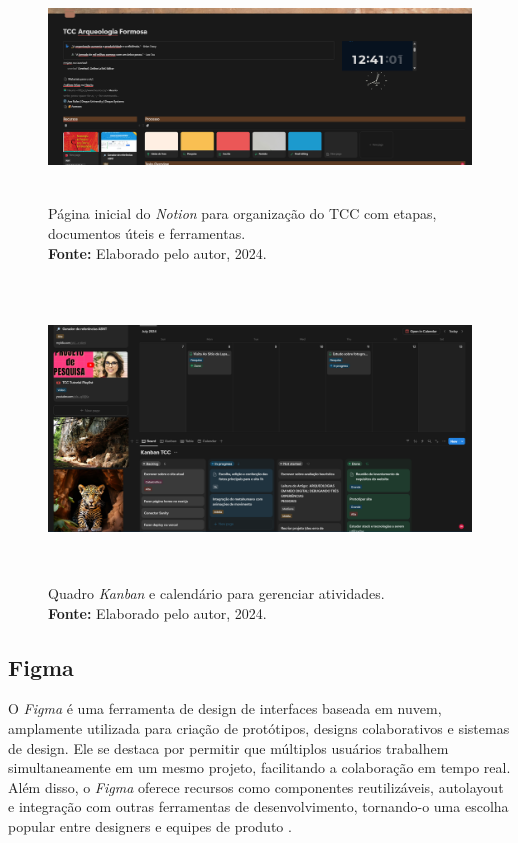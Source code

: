 {\begin{figure}[H]
    \centering
    \includegraphics[height=6cm, keepaspectratio]{img/Notion/pagina inicial.png}
    \caption{ Página inicial do \textit{Notion} para organização do TCC com etapas, \\ documentos úteis e ferramentas. \\
        \textbf{Fonte:} Elaborado pelo autor, 2024.}
    \label{fig:notion inicial}
\end{figure}

\begin{figure}[H]
    \centering
    \includegraphics[height=8cm, keepaspectratio]{img/Notion/kanban.png}
    \caption{ Quadro \textit{Kanban} e calendário para gerenciar atividades. \\
        \textbf{Fonte:} Elaborado pelo autor, 2024.}
    \label{fig:kanban notion}
\end{figure}


\subsection{Figma}
O \textit{Figma} é uma ferramenta de design de interfaces baseada em nuvem, amplamente utilizada para criação de protótipos, designs colaborativos e sistemas de design. Ele se destaca por permitir que múltiplos usuários trabalhem simultaneamente em um mesmo projeto, facilitando a colaboração em tempo real. Além disso, o \textit{Figma} oferece recursos como componentes reutilizáveis, autolayout e integração com outras ferramentas de desenvolvimento, tornando-o uma escolha popular entre designers e equipes de produto \citep{figma}.

}
